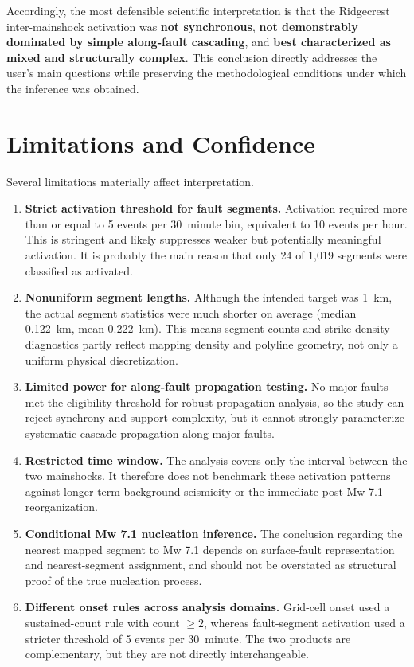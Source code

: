 \documentclass[11pt]{article}
\begin{document}
Accordingly, the most defensible scientific interpretation is that the Ridgecrest inter-mainshock activation was \textbf{not synchronous}, \textbf{not demonstrably dominated by simple along-fault cascading}, and \textbf{best characterized as mixed and structurally complex}. This conclusion directly addresses the user’s main questions while preserving the methodological conditions under which the inference was obtained.

\section{Limitations and Confidence}
Several limitations materially affect interpretation.
\begin{enumerate}[label=\arabic*.]
    \item \textbf{Strict activation threshold for fault segments.} Activation required more than or equal to 5 events per \SI{30}{minute} bin, equivalent to 10 events per hour. This is stringent and likely suppresses weaker but potentially meaningful activation. It is probably the main reason that only 24 of 1,019 segments were classified as activated.
    \item \textbf{Nonuniform segment lengths.} Although the intended target was \SI{1}{km}, the actual segment statistics were much shorter on average (median \SI{0.122}{km}, mean \SI{0.222}{km}). This means segment counts and strike-density diagnostics partly reflect mapping density and polyline geometry, not only a uniform physical discretization.
    \item \textbf{Limited power for along-fault propagation testing.} No major faults met the eligibility threshold for robust propagation analysis, so the study can reject synchrony and support complexity, but it cannot strongly parameterize systematic cascade propagation along major faults.
    \item \textbf{Restricted time window.} The analysis covers only the interval between the two mainshocks. It therefore does not benchmark these activation patterns against longer-term background seismicity or the immediate post-Mw 7.1 reorganization.
    \item \textbf{Conditional Mw 7.1 nucleation inference.} The conclusion regarding the nearest mapped segment to Mw 7.1 depends on surface-fault representation and nearest-segment assignment, and should not be overstated as structural proof of the true nucleation process.
    \item \textbf{Different onset rules across analysis domains.} Grid-cell onset used a sustained-count rule with count \(\ge 2\), whereas fault-segment activation used a stricter threshold of 5 events per \SI{30}{minute}. The two products are complementary, but they are not directly interchangeable.
\end{enumerate}
\end{document}
